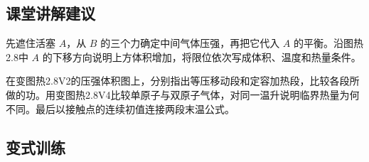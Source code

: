 \documentclass[UTF8,fontset=fandol,a4paper,11pt]{ctexart}
\begin{document}
\subsection*{课堂讲解建议}

先遮住活塞 $A$，从 $B$ 的三个力确定中间气体压强，再把它代入 $A$ 的平衡。沿图热2.8中 $A$ 的下移方向说明上方体积增加，将限位依次写成体积、温度和热量条件。

在变图热2.8V2的压强体积图上，分别指出等压移动段和定容加热段，比较各段所做的功。用变图热2.8V4比较单原子与双原子气体，对同一温升说明临界热量为何不同。最后以接触点的连续初值连接两段末温公式。



\subsection*{变式训练}
\end{document}
